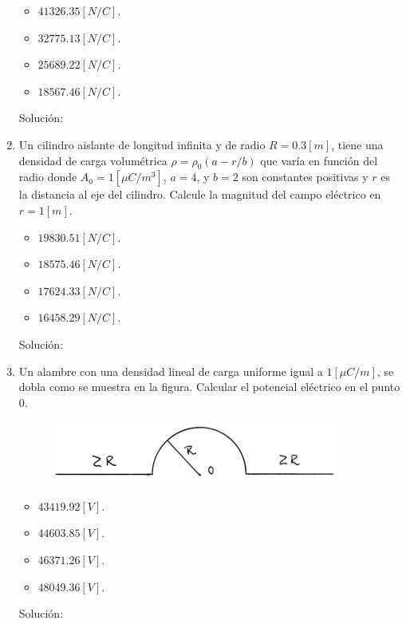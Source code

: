 \documentclass[letter,11pt]{article}
\begin{document}
\begin{enumerate}
\begin{itemize}
    \item $41326.35 [N/C]$.
    \item $32775.13 [N/C]$.
    \item $25689.22 [N/C]$.
    \item $18567.46 [N/C]$.
\end{itemize}

Solución: \\

\item  Un cilindro aislante de longitud infinita y de radio $R = 0.3 [m]$, tiene
una densidad de carga volumétrica $\rho = \rho_0 (a - r/b )$ que varía en función del
radio donde $A_0 = 1 [\mu C/m^3]$, $a = 4$, y $b = 2$ son constantes positivas y
$r$ es la distancia al eje del cilindro. Calcule la magnitud del campo eléctrico
en $r = 1 [m]$.

\begin{itemize}
    \item $19830.51 [N/C]$.
    \item $18575.46 [N/C]$.
    \item $17624.33 [N/C]$.
    \item $16458.29 [N/C]$.
\end{itemize}

Solución: \\

\item Un alambre con una densidad lineal de carga uniforme igual a
$1 [\mu C/m]$, se dobla como se muestra en la figura. Calcular el potencial
eléctrico en el punto $0$.

\begin{figure}[!h]
\centering
\includegraphics[scale=1.80]{resources/q4.eps}
\end{figure}

\begin{itemize}
    \item $43419.92 [V]$.
    \item $44603.85 [V]$.
    \item $46371.26 [V]$.
    \item $48049.36 [V]$.
\end{itemize}

Solución: \\


\end{enumerate}
\end{document}
